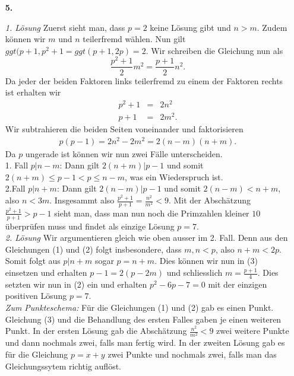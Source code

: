 \documentclass[12pt,a4paper]{article}
\theoremstyle{plain}
\theoremstyle{definition}
\theoremstyle{remark}
\begin{document}
\begin{enumerate}
\item[\textbf{5.}]

\textit{1. Lösung} Zuerst sieht man, dass $p=2$ keine Lösung gibt und $n>m$. Zudem können wir $m$ und $n$ teilerfremd wählen. Nun gilt $ggt(p+1,p^2+1= ggt(p+1,2p) =2$. Wir schreiben die Gleichung nun als
\[\frac{p^2+1}{2}m^2=\frac{p+1}{2}n^2.\]
Da jeder der beiden Faktoren links teilerfremd zu einem der Faktoren rechts ist erhalten wir
\begin{eqnarray}
p^2+1&=&2n^2\\
p+1&=&2m^2.
\end{eqnarray}
Wir subtrahieren die beiden Seiten voneinander und faktorisieren
\begin{eqnarray}p(p-1)=2n^2 - 2m^2=2(n-m)(n+m).
\end{eqnarray}
Da $p$ ungerade ist können wir nun zwei Fälle unterscheiden.\\
1. Fall $p | n-m$: Dann gilt $2(n+m)|p-1$ und somit $2(n+m) \leq p-1 < p \leq n-m$, was ein Wiederspruch ist.\\
2.Fall $p|n+m$: Dann gilt $2(n-m)|p-1$ und somit $2(n-m) < n+m$, also $n<3m$. Insgesammt also $\frac{p^2+1}{p+1} = \frac{n^2}{m^2}<9$. Mit der Abschätzung $\frac{p^2+1}{p+1} > p-1$ sieht man, dass man nun noch die Primzahlen kleiner $10$ überprüfen muss und findet als einzige Lösung $p=7$.\\

\textit{2. Lösung} Wir argumentieren gleich wie oben ausser im 2. Fall. Denn aus den Gleichungen (1) und (2) folgt insbesondere, dass $m,n < p$, also $n+m <2p$. Somit folgt aus $p|n+m$ sogar $p=n+m$. Dies können wir nun in (3) einsetzen und erhalten $p-1=2(p-2m)$ und schliesslich $m=\frac{p+1}{4}$. Dies setzten wir nun in (2) ein und erhalten $p^2-6p-7=0$ mit der einzigen positiven Lösung $p=7$.\\

\textit{Zum Punkteschema:} Für die Gleichungen (1) und (2) gab es einen Punkt. Gleichung (3) und die Behandlung des ersten Falles gaben je einen weiteren Punkt. In der ersten Lösung gab die Abschätzung $\frac{n^2}{m^2} < 9$ zwei weitere Punkte  und dann nochmals zwei, falls man fertig wird. In der zweiten Lösung gab es für die Gleichung $p=x+y$ zwei Punkte und nochmals zwei, falls man das Gleichungssytem richtig auflöst. 









\end{enumerate}
\end{document}
